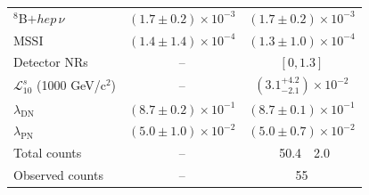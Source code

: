 \begin{table}[ht]
\begin{tabular}{l
            r@{$\,\pm\,$}l
            r@{$\,\pm\,$}l}
     $^{8}$B$+hep\,\nu$              & \multicolumn{2}{c}{$(1.7 \pm 0.2) \times 10^{-3}$} & \multicolumn{2}{c}{$(1.7 \pm 0.2) \times 10^{-3}$} \\
     MSSI                            & \multicolumn{2}{c}{$(1.4 \pm 1.4) \times 10^{-4}$} & \multicolumn{2}{c}{$(1.3 \pm 1.0) \times 10^{-4}$} \\
     Detector NRs                    & \multicolumn{2}{c}{--} & \multicolumn{2}{c}{$[0, 1.3]$}$\,\,\,\,\,\,\,\,\,\,\,\,\,\,\,\,$ \\
     $\mathcal{L}_{10}^s$ (1000 GeV/c$^2$)                & \multicolumn{2}{c}{--} & \multicolumn{2}{c}{$\left(3.1^{+4.2}_{-2.1}\right) \times 10^{-2}$} \\
     \hline
     $\lambda_{\text{DN}}$           & \multicolumn{2}{c}{$(8.7 \pm 0.2) \times 10^{-1}$} & \multicolumn{2}{c}{$(8.7 \pm 0.1) \times 10^{-1}$} \\
     $\lambda_{\text{PN}}$           & \multicolumn{2}{c}{$(5.0 \pm 1.0) \times 10^{-2}$} & \multicolumn{2}{c}{$(5.0 \pm 0.7) \times 10^{-2}$} \\ \hline
     \hline
     Total counts                    & \multicolumn{2}{c}{--} & 50.4 & 2.0 \\
     \hline
     Observed counts                 & \multicolumn{2}{c}{--} & \multicolumn{2}{c}{55} $\,\,\,\,\,\,\,\,\,\,\,\,\,\,\,$\\
     \hline \hline
    \end{tabular}
    \label{tab:delayed_sample_fit_table} 
\end{table}